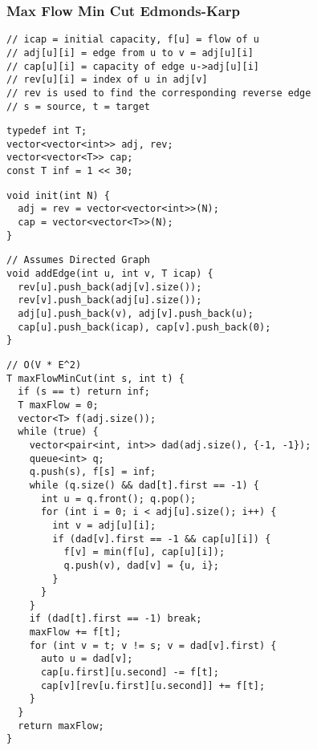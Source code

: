 \documentclass[twoside]{article}
\newcommand{\fileTitleStyle}{\large\underline}
\begin{document}
\begin{multicols*}{2}
\subsubsectionfont{\centering\bfseries\Large}
\subsubsectionfont{\fileTitleStyle}
\subsubsection*{Max Flow Min Cut Edmonds-Karp}
\begin{verbatim}
// icap = initial capacity, f[u] = flow of u
// adj[u][i] = edge from u to v = adj[u][i]
// cap[u][i] = capacity of edge u->adj[u][i]
// rev[u][i] = index of u in adj[v]
// rev is used to find the corresponding reverse edge
// s = source, t = target
\end{verbatim}
\vspace{-12pt}
\begin{verbatim}
typedef int T;
vector<vector<int>> adj, rev;
vector<vector<T>> cap;
const T inf = 1 << 30;
\end{verbatim}
\vspace{-12pt}
\begin{verbatim}
void init(int N) {
  adj = rev = vector<vector<int>>(N);
  cap = vector<vector<T>>(N);
}
\end{verbatim}
\vspace{-12pt}
\begin{verbatim}
// Assumes Directed Graph
void addEdge(int u, int v, T icap) {
  rev[u].push_back(adj[v].size());
  rev[v].push_back(adj[u].size());
  adj[u].push_back(v), adj[v].push_back(u);
  cap[u].push_back(icap), cap[v].push_back(0);
}
\end{verbatim}
\vspace{-12pt}
\begin{verbatim}
// O(V * E^2)
T maxFlowMinCut(int s, int t) {
  if (s == t) return inf;
  T maxFlow = 0;
  vector<T> f(adj.size());
  while (true) {
    vector<pair<int, int>> dad(adj.size(), {-1, -1});
    queue<int> q;
    q.push(s), f[s] = inf;
    while (q.size() && dad[t].first == -1) {
      int u = q.front(); q.pop();
      for (int i = 0; i < adj[u].size(); i++) {
        int v = adj[u][i];
        if (dad[v].first == -1 && cap[u][i]) {
          f[v] = min(f[u], cap[u][i]);
          q.push(v), dad[v] = {u, i};
        }
      }
    }
    if (dad[t].first == -1) break;
    maxFlow += f[t];
    for (int v = t; v != s; v = dad[v].first) {
      auto u = dad[v];
      cap[u.first][u.second] -= f[t];
      cap[v][rev[u.first][u.second]] += f[t];
    }
  }
  return maxFlow;
}
\end{verbatim}


\end{multicols*}
\end{document}

